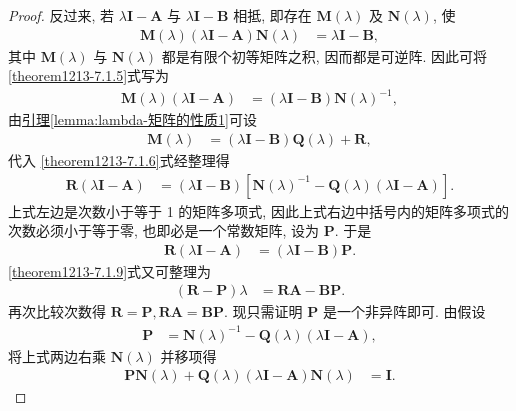 \documentclass[../../main.tex]{subfiles}%
\begin{document}
\begin{proof}
反过来, 若 $\lambda\boldsymbol{I}-\boldsymbol{A}$ 与 $\lambda\boldsymbol{I}-\boldsymbol{B}$ 相抵, 即存在 $\boldsymbol{M}(\lambda)$ 及 $\boldsymbol{N}(\lambda)$, 使
\begin{align}
\boldsymbol{M}(\lambda)(\lambda\boldsymbol{I}-\boldsymbol{A})\boldsymbol{N}(\lambda)&=\lambda\boldsymbol{I}-\boldsymbol{B}, \label{theorem1213-7.1.5}
\end{align}
其中 $\boldsymbol{M}(\lambda)$ 与 $\boldsymbol{N}(\lambda)$ 都是有限个初等矩阵之积, 因而都是可逆阵. 因此可将 \eqref{theorem1213-7.1.5}式写为
\begin{align}
\boldsymbol{M}(\lambda)(\lambda\boldsymbol{I}-\boldsymbol{A})&=(\lambda\boldsymbol{I}-\boldsymbol{B})\boldsymbol{N}(\lambda)^{-1}, \label{theorem1213-7.1.6}
\end{align}
由\hyperref[lemma:lambda-矩阵的性质1]{引理\ref{lemma:lambda-矩阵的性质1}}可设
\begin{align*}
\boldsymbol{M}(\lambda)&=(\lambda\boldsymbol{I}-\boldsymbol{B})\boldsymbol{Q}(\lambda)+\boldsymbol{R},
\end{align*}
代入 \eqref{theorem1213-7.1.6}式经整理得
\begin{align*}
\boldsymbol{R}(\lambda\boldsymbol{I}-\boldsymbol{A})&=(\lambda\boldsymbol{I}-\boldsymbol{B})[\boldsymbol{N}(\lambda)^{-1}-\boldsymbol{Q}(\lambda)(\lambda\boldsymbol{I}-\boldsymbol{A})].
\end{align*}
上式左边是次数小于等于 1 的矩阵多项式, 因此上式右边中括号内的矩阵多项式的次数必须小于等于零, 也即必是一个常数矩阵, 设为 $\boldsymbol{P}$. 于是
\begin{align}
\boldsymbol{R}(\lambda\boldsymbol{I}-\boldsymbol{A})&=(\lambda\boldsymbol{I}-\boldsymbol{B})\boldsymbol{P}. \label{theorem1213-7.1.9}
\end{align}
\eqref{theorem1213-7.1.9}式又可整理为
\begin{align*}
(\boldsymbol{R}-\boldsymbol{P})\lambda&=\boldsymbol{R}\boldsymbol{A}-\boldsymbol{B}\boldsymbol{P}.
\end{align*}
再次比较次数得 $\boldsymbol{R}=\boldsymbol{P}, \boldsymbol{R}\boldsymbol{A}=\boldsymbol{B}\boldsymbol{P}$. 现只需证明 $\boldsymbol{P}$ 是一个非异阵即可. 由假设
\begin{align*}
\boldsymbol{P}&=\boldsymbol{N}(\lambda)^{-1}-\boldsymbol{Q}(\lambda)(\lambda\boldsymbol{I}-\boldsymbol{A}),
\end{align*}
将上式两边右乘 $\boldsymbol{N}(\lambda)$ 并移项得
\begin{align*}
\boldsymbol{P}\boldsymbol{N}(\lambda)+\boldsymbol{Q}(\lambda)(\lambda\boldsymbol{I}-\boldsymbol{A})\boldsymbol{N}(\lambda)&=\boldsymbol{I}.

\end{align*}
\end{proof}
\end{document}
